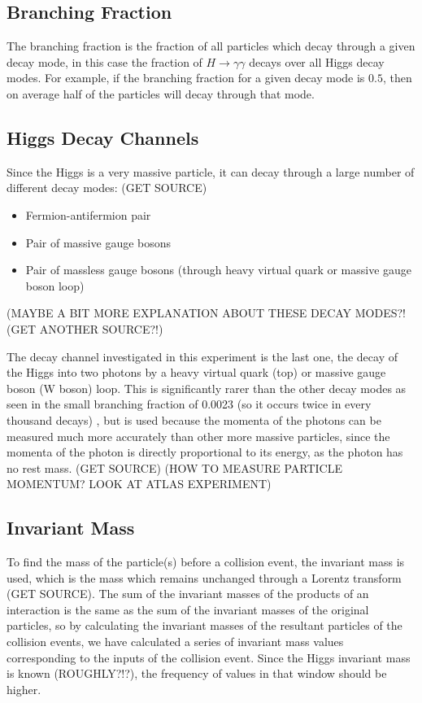 \documentclass[11pt]{amsart}
\begin{document}
\begin{multicols}{2}
\subsection{Branching Fraction}
\label{sec:branching}

The branching fraction is the fraction of all particles which decay through a given decay mode, in this case the fraction of $H \to \gamma\gamma$ decays over all Higgs decay modes. For example, if the branching fraction for a given decay mode is $0.5$, then on average half of the particles will decay through that mode.

\subsection{Higgs Decay Channels}

Since the Higgs is a very massive particle, it can decay through a large number of different decay modes: (GET SOURCE)

\begin{itemize}
    \item Fermion-antifermion pair
    \item Pair of massive gauge bosons
    \item Pair of massless gauge bosons (through heavy virtual quark or massive gauge boson loop)
\end{itemize}

\cite{decaymodes1} \cite{decaymodes2}

(MAYBE A BIT MORE EXPLANATION ABOUT THESE DECAY MODES?! (GET ANOTHER SOURCE?!)

The decay channel investigated in this experiment is the last one, the decay of the Higgs into two photons by a heavy virtual quark (top) or massive gauge boson (W boson) loop. This is significantly rarer than the other decay modes as seen in the small branching fraction of 0.0023 (so it occurs twice in every thousand decays) \cite{HiggsCross1}, but is used because the momenta of the photons can be measured much more accurately than other more massive particles, since the momenta of the photon is directly proportional to its energy, as the photon has no rest mass. (GET SOURCE) (HOW TO MEASURE PARTICLE MOMENTUM? LOOK AT ATLAS EXPERIMENT)

\subsection{Invariant Mass}
\label{sec:invariant}

To find the mass of the particle(s) before a collision event, the invariant mass is used, which is the mass which remains unchanged through a Lorentz transform (GET SOURCE). The sum of the invariant masses of the products of an interaction is the same as the sum of the invariant masses of the original particles, so by calculating the invariant masses of the resultant particles of the collision events, we have calculated a series of invariant mass values corresponding to the inputs of the collision event. Since the Higgs invariant mass is known (ROUGHLY?!?), the frequency of values in that window should be higher.


\end{multicols}
\end{document}
